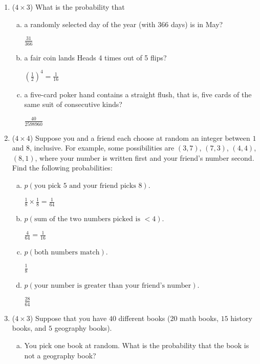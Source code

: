 \documentclass[12pt]{article}
\begin{document}
	\begin{enumerate}

		\item ($4 \times 3$)
		What is the probability that
		\begin{enumerate}[a.]
			\item a randomly selected day of the year (with 366 days) is in May?

			$\frac{31}{366}$

			\item a fair coin lands Heads 4 times out of 5 flips?

			$(\frac{1}{2})^4 = \frac{1}{16}$

			\item a five-card poker hand contains a straight flush, that is, five cards of the same suit of consecutive kinds?

			$ \frac{40}{2598960}$
		\end{enumerate}



	\newpage
		\item ($4 \times 4$)
		Suppose you and a friend each choose at random an integer between $1$ and $8$, inclusive. For example, some possibilities are $(3, 7)$, $(7, 3)$, $(4, 4)$, $(8, 1)$, where your number is written first and your friend's number second. Find the following probabilities:
		\begin{enumerate}[a.]
			\item $p(\text{you pick $5$ and your friend picks $8$})$.

			$\frac{1}{8} \times \frac{1}{8} = \frac{1}{64}$

			\item $p(\text{sum of the two numbers picked is $<4$})$.

			$\frac{4}{64} = \frac{1}{16}$

			\item $p(\text{both numbers match})$.

			$\frac{1}{8}$

			\item $p(\text{your number is greater than your friend's number})$.

			$\frac{28}{64}$
		\end{enumerate}

			\newpage
		\item ($4 \times 3$)
		Suppose that you have $40$ different books ($20$ math books, $15$ history books, and $5$ geography books).
		\begin{enumerate}[a.]
			\item You pick one book at random. What is the probability that the book is not a geography book?


\end{enumerate}
\end{enumerate}
\end{document}

